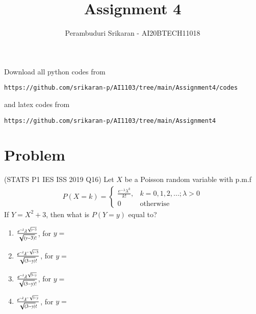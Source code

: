\documentclass[journal,12pt,twocolumn]{IEEEtran}
\begin{document}
\let\StandardTheFigure\thefigure
\let\vec\mathbf
\renewcommand{\thefigure}{\theproblem}
\def\putbox#1#2#3{\makebox[0in][l]{\makebox[#1][l]{}\raisebox{\baselineskip}[0in][0in]{\raisebox{#2}[0in][0in]{#3}}}}
     \def\rightbox#1{\makebox[0in][r]{#1}}
     \def\centbox#1{\makebox[0in]{#1}}
     \def\topbox#1{\raisebox{-\baselineskip}[0in][0in]{#1}}
     \def\midbox#1{\raisebox{-0.5\baselineskip}[0in][0in]{#1}}
\vspace{3cm}
\title{Assignment 4}
\author{Perambuduri Srikaran - AI20BTECH11018}
\maketitle
\newpage
\bigskip
\renewcommand{\thefigure}{\theenumi}
\renewcommand{\thetable}{\theenumi}
Download all python codes from
\begin{lstlisting}
https://github.com/srikaran-p/AI1103/tree/main/Assignment4/codes
\end{lstlisting}
and latex codes from 
\begin{lstlisting}
https://github.com/srikaran-p/AI1103/tree/main/Assignment4
\end{lstlisting}
\section*{Problem}
(STATS P1 IES ISS 2019 Q16) Let $X$ be a Poisson random variable with p.m.f
\begin{align}
\label{eq:1}
P(X=k) = 
    \begin{cases} 
      \frac{e^{-\lambda}\lambda^{k}}{k!},& k=0,1,2,...;  \lambda > 0\\
      0 & \text{otherwise}
   \end{cases}
\end{align}
If $Y = X^2 + 3$, then what is $P(Y=y)$ equal to?
\begin{enumerate}[label={(\Alph*)}]
    \item $\frac{e^{-\lambda}\lambda^{\sqrt{y-3}}}{\sqrt{\left(y-3\right)}!}$, for $y =$ 
    \item $\frac{e^{-\lambda}\lambda^{-\sqrt{y-3}}}{\sqrt{\left(3-y\right)}!}$, for $y =$ 
    \item $\frac{e^{-\lambda}\lambda^{\sqrt{3-y}}}{\sqrt{\left(3-y\right)}!}$, for $y =$ 
    \item $\frac{e^{-\lambda}\lambda^{-\sqrt{3-y}}}{\sqrt{\left(3-y\right)}!}$, for $y =$ 
\end{enumerate}
\end{document}
